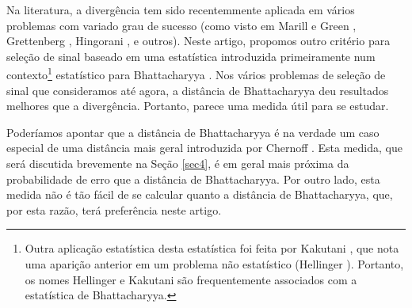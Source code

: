 \documentclass{sbrt2017port}
\begin{document}
Na literatura, a divergência tem sido recentemmente aplicada em vários problemas com variado grau de sucesso (como visto em Marill e Green \cite{r9}, Grettenberg \cite{r10}, Hingorani \cite{r11}, e outros). Neste artigo, propomos outro critério para seleção de sinal baseado em uma estatística introduzida primeiramente num contexto\footnote[2]{Outra aplicação estatística desta estatística foi feita por Kakutani \cite{r13}, que nota uma aparição anterior em um problema não estatístico (Hellinger \cite{r14}). Portanto, os nomes Hellinger e Kakutani são frequentemente associados com a estatística de Bhattacharyya.}
estatístico para Bhattacharyya \cite{r12}. Nos vários problemas de seleção de sinal que consideramos até agora, a distância de Bhattacharyya deu resultados melhores que a divergência. Portanto, parece uma medida útil para se estudar.

Poderíamos apontar que a distância de Bhattacharyya é na verdade um caso especial de uma distância mais geral introduzida por Chernoff \cite{r15}. Esta medida, que será discutida brevemente na Seção \ref{sec4}, é em geral mais próxima da probabilidade de erro que a distância de Bhattacharyya. Por outro lado, esta medida não é tão fácil de se calcular quanto a distância de Bhattacharyya, que, por esta razão, terá preferência neste artigo.
\end{document}
